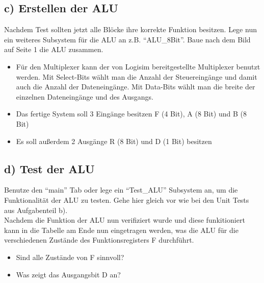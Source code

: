\documentclass[a4paper]{scrartcl}
\begin{document}
\subsection*{c) Erstellen der ALU}
Nachdem Test sollten jetzt alle Blöcke ihre korrekte Funktion besitzen. Lege nun ein weiteres Subsystem für die ALU an z.B. ``ALU\_8Bit''. 
Baue nach dem Bild auf Seite 1 die ALU zusammen.\\
\begin{itemize}
  \item Für den Multiplexer kann der von Logisim bereitgestellte Multiplexer benutzt werden. Mit Select-Bits wählt man die Anzahl der Steuereingänge und
  damit auch die Anzahl der Dateneingänge. Mit Data-Bits wählt man die breite der einzelnen Dateneingänge und des Ausgangs.
  \item Das fertige System soll 3 Eingänge besitzen F (4 Bit), A (8 Bit) und B (8 Bit)
  \item Es soll außerdem 2 Ausgänge R (8 Bit) und D (1 Bit) besitzen

\end{itemize}

\subsection*{d) Test der ALU}
Benutze den ``main'' Tab oder lege ein ``Test\_ALU'' Subsystem an, um die Funktionalität der ALU zu testen. Gehe hier gleich vor wie bei den 
Unit Tests aus Aufgabenteil b).\\

Nachdem die Funktion der ALU nun verifiziert wurde und diese funkitioniert kann in die Tabelle am Ende nun eingetragen werden, was die ALU für
die verschiedenen Zustände des Funktionsregisters F durchführt.
\begin{itemize}
  \item Sind alle Zustände von F sinnvoll?
  \item Was zeigt das Ausgangsbit D an?
\end{itemize}
\end{document}
